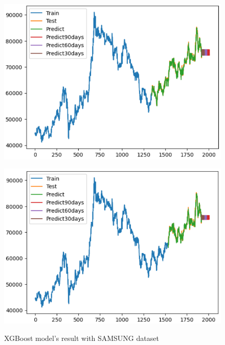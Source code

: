 \documentclass{article}
\begin{document}
\begin{multicols}{2}
\begin{figure}[H]
\begin{minipage}{0.15\textwidth}
    \label{fig:1}
    \end{minipage}%
    \begin{minipage}{0.15\textwidth}
    \centering
    \includegraphics[width=1\textwidth]{Image/XGBoost/XGBoost_SAMSUNG_7_3.png}
  
    \label{fig:2}
    \end{minipage}%
    \begin{minipage}{0.15\textwidth}
    \centering
    \includegraphics[width=1\textwidth]{Image/XGBoost/XGBoost_SAMSUNG_8_2.png}

    \label{fig:3}
    \end{minipage}
    \caption{ XGBoost model's result with SAMSUNG dataset }
\end{figure}




\end{multicols}
\end{document}
